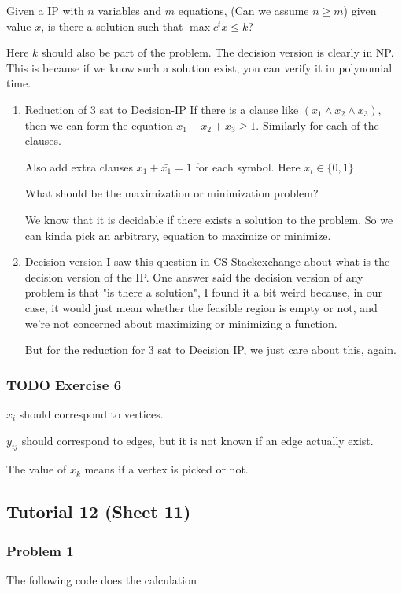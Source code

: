 \documentclass[11pt]{article}
\def\max{\operatorname{max}}
\begin{document}
Given a IP with \(n\) variables and \(m\) equations, (Can we assume \(n \ge m\))
given value \(x\), is there a solution such that \(\max c^t x \le k\)?

Here \(k\) should also be part of the problem. The decision version is clearly
in NP. This is because if we know such a solution exist, you can verify it
in polynomial time.
\begin{enumerate}
\item Reduction of 3 sat to Decision-IP
\label{sec:org0289d5e}
If there is a clause like \((x_1 \wedge x_2 \wedge x_3)\), then we can form
the equation \(x_1 + x_2 + x_3 \ge 1\). Similarly for each of the clauses.

Also add extra clauses \(x_1 + \bar{x_1} = 1\) for each symbol. Here \(x_i \in \{0, 1\}\)

What should be the maximization or minimization problem?

We know that it is decidable if there exists a solution to the problem. So
we can kinda pick an arbitrary, equation to maximize or minimize.
\item Decision version
\label{sec:orgaaec0de}
I saw this question in CS Stackexchange about what is the decision version
of the IP. One answer said the decision version of any problem is that "is
there a solution", I found it a bit weird because, in our case, it would
just mean whether the feasible region is empty or not, and we're not
concerned about maximizing or minimizing a function.

But for the reduction for \(3\) sat to Decision IP, we just care about this,
again.
\end{enumerate}
\subsubsection{{\bfseries\sffamily TODO} Exercise 6}
\label{sec:orgbef93b5}
\(x_i\) should correspond to vertices.

\(y_{ij}\) should correspond to edges, but it is not known if an edge actually
exist.

The value of \(x_k\) means if a vertex is picked or not.
\subsection{Tutorial 12 (Sheet 11)}
\label{sec:org6856951}
\subsubsection{Problem 1}
\label{sec:orge901d93}
The following code does the calculation
\end{document}
